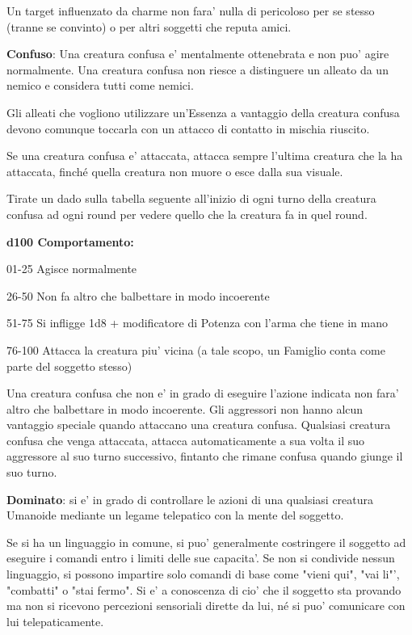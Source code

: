 \documentclass[a4paper,11pt,twoside,openany]{book}
\begin{document}
{Un target influenzato da charme non fara' nulla di pericoloso per se stesso (tranne se convinto) o per altri soggetti che reputa amici.

\textbf{Confuso}: Una creatura confusa e' mentalmente ottenebrata e non puo' agire normalmente. Una creatura confusa non riesce a distinguere un alleato da un nemico e considera tutti come nemici.

Gli alleati che vogliono utilizzare un'Essenza a vantaggio della creatura confusa devono comunque toccarla con un attacco di contatto in mischia riuscito.

Se una creatura confusa e' attaccata, attacca sempre l'ultima creatura che la ha attaccata, finché quella creatura non muore o esce dalla sua visuale.

Tirate un dado sulla tabella seguente all'inizio di ogni turno della
creatura confusa ad ogni round per vedere quello che la creatura fa
in quel round.

\textbf{d100 Comportamento:}

01-25 Agisce normalmente

26-50 Non fa altro che balbettare in modo incoerente

51-75 Si infligge 1d8 + modificatore di Potenza con l'arma che tiene in mano

76-100 Attacca la creatura piu' vicina (a tale scopo, un Famiglio conta come parte del soggetto stesso)

Una creatura confusa che non e' in grado di eseguire l'azione indicata non fara' altro che balbettare in modo incoerente. Gli aggressori non hanno alcun vantaggio speciale quando attaccano una creatura confusa. Qualsiasi creatura confusa che venga attaccata, attacca automaticamente a sua volta il suo aggressore al suo turno successivo, fintanto che rimane confusa quando giunge il suo turno.

\textbf{Dominato}: si e' in grado di controllare le azioni di una qualsiasi creatura Umanoide mediante un legame telepatico con la mente del soggetto.

Se si ha un linguaggio in comune, si puo' generalmente costringere il soggetto ad eseguire i comandi entro i limiti delle sue capacita'. Se non si condivide nessun linguaggio, si possono impartire solo comandi di base come "vieni qui", "vai li"', "combatti" o "stai fermo". Si e' a conoscenza di cio' che il soggetto sta provando ma non si ricevono percezioni sensoriali dirette da lui, né si puo' comunicare con lui telepaticamente.

}
\end{document}
